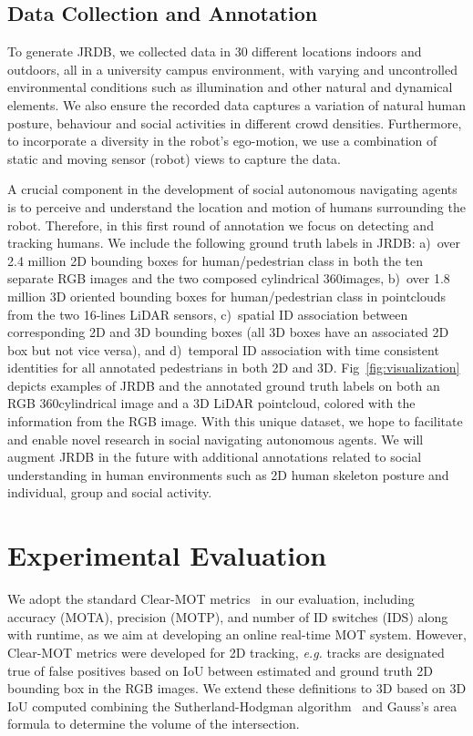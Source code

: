 \documentclass[letterpaper, 10 pt, conference]{ieeeconf}
\newcommand{\jrdb}{JRDB\xspace}
\newcommand{\eg}{\emph{e.g.}\xspace}
\begin{document}
\subsection{Data Collection and Annotation}

To generate \jrdb, we collected data in 30 different locations indoors and outdoors, all in a university campus environment, with varying and uncontrolled environmental conditions such as illumination and other natural and dynamical elements. We also ensure the recorded data captures a variation of natural human posture, behaviour and social activities in different crowd densities. Furthermore, to incorporate a diversity in the robot's ego-motion, we use a combination of static and moving sensor (robot) views to capture the data.

A crucial component in the development of social autonomous navigating agents is to perceive and understand the location and motion of humans surrounding the robot. Therefore, in this first round of annotation we focus on detecting and tracking humans. We include the following ground truth labels in \jrdb: a)~over 2.4 million 2D bounding boxes for human/pedestrian class in both the ten separate RGB images and the two composed cylindrical 360\degree images, b)~over 1.8 million 3D oriented bounding boxes for human/pedestrian class in pointclouds from the two 16-lines LiDAR sensors, c)~spatial ID association between corresponding 2D and 3D bounding boxes (all 3D boxes have an associated 2D box but not vice versa), and d)~temporal ID association with time consistent identities for all annotated pedestrians in both 2D and 3D. Fig~\ref{fig:visualization} depicts examples of \jrdb and the annotated ground truth labels on both an RGB 360\degree cylindrical image and a 3D LiDAR pointcloud, colored with the information from the RGB image. With this unique dataset, we hope to facilitate and enable novel research in social navigating autonomous agents. We will augment \jrdb in the future with additional annotations related to social understanding in human environments such as 2D human skeleton posture and individual, group and social activity. \vspace{-0.025cm}
\section{Experimental Evaluation}
\label{s:exp}

We adopt the standard Clear-MOT metrics~\cite{bernardin2008evaluating} in our evaluation, including accuracy (MOTA), precision (MOTP), and number of ID switches (IDS) along with runtime, as we aim at developing an online real-time MOT system. However, Clear-MOT metrics were developed for 2D tracking, \eg tracks are designated true of false positives based on IoU between estimated and ground truth 2D bounding box in the RGB images. We extend these definitions to 3D based on 3D IoU computed combining the Sutherland-Hodgman algorithm~\cite{sutherland1974reentrant} and Gauss's area formula to determine the volume of the intersection.
\end{document}
